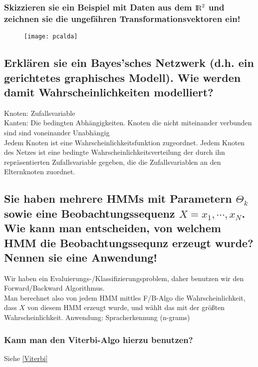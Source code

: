 \documentclass[12pt]{scrartcl}
\begin{document}
\subsubsection{Skizzieren sie ein Beispiel mit Daten aus dem ${\rm I\!R}^2$ und zeichnen sie die ungefähren Transformationsvektoren ein!}
\begin{figure}[htb]
  \begin{center}
  \texttt{[image: pcalda]}
  \end{center}
  \vspace{-\baselineskip}
\end{figure}

\subsection{Erklären sie ein Bayes'sches Netzwerk (d.h. ein gerichtetes graphisches Modell). Wie werden damit Wahrscheinlichkeiten modelliert?}

Knoten: Zufallsvariable \\
Kanten: Die bedingten Abhängigkeiten. Knoten die nicht miteinander verbunden sind sind voneinander Unabhängig \\
Jedem Knoten ist eine Wahrscheinlichkeitsfunktion zugeordnet. Jedem Knoten des Netzes ist eine bedingte Wahrscheinlichkeitsverteilung der durch ihn repräsentierten Zufallsvariable gegeben, die die Zufallsvariablen an den Elternknoten zuordnet.

\subsection{Sie haben mehrere HMMs mit Parametern $\Theta_k$ sowie eine Beobachtungssequenz $X = x_1, \cdots , x_N$. Wie kann man entscheiden, von welchem HMM die Beobachtungssequnz erzeugt wurde? Nennen sie eine Anwendung!}
Wir haben ein Evaluierungs-/Klassifizierungsproblem, daher benutzen wir den Forward/Backward Algorithmus. \\
Man berechnet also von jedem HMM mittles F/B-Algo die Wahrscheinlichkeit, dass $X$ von diesem HMM erzeugt wurde, und wählt das mit der größten Wahrscheinlichkeit. Anwendung: Spracherkennung (n-grams) \\

\subsubsection{Kann man den Viterbi-Algo hierzu benutzen?}
Siehe \ref{Viterbi}
\end{document}
